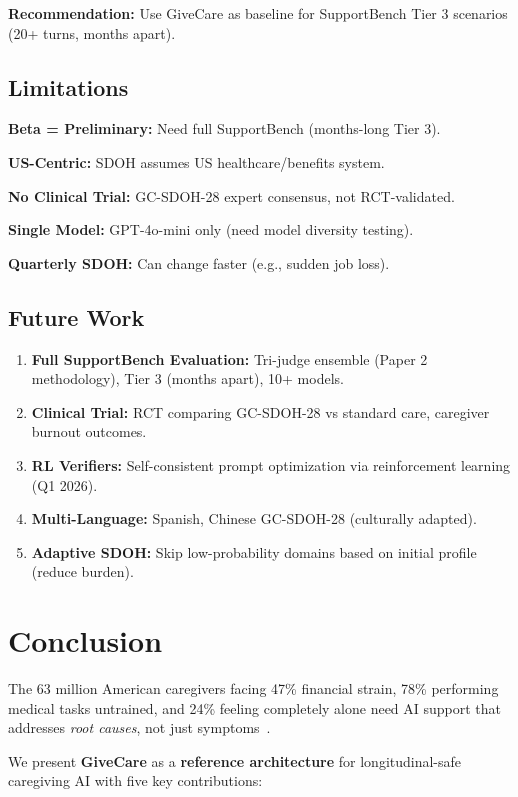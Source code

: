 \documentclass{article}
\begin{document}
\textbf{Recommendation:} Use GiveCare as baseline for SupportBench Tier 3 scenarios (20+ turns, months apart).

%
\subsection{Limitations}%
\label{subsec:Limitations}%
\textbf{Beta = Preliminary:} Need full SupportBench (months-long Tier 3).

\textbf{US-Centric:} SDOH assumes US healthcare/benefits system.

\textbf{No Clinical Trial:} GC-SDOH-28 expert consensus, not RCT-validated.

\textbf{Single Model:} GPT-4o-mini only (need model diversity testing).

\textbf{Quarterly SDOH:} Can change faster (e.g., sudden job loss).

%
\subsection{Future Work}%
\label{subsec:FutureWork}%
\begin{enumerate}
    \item \textbf{Full SupportBench Evaluation:} Tri-judge ensemble (Paper 2 methodology), Tier 3 (months apart), 10+ models.
    \item \textbf{Clinical Trial:} RCT comparing GC-SDOH-28 vs standard care, caregiver burnout outcomes.
    \item \textbf{RL Verifiers:} Self-consistent prompt optimization via reinforcement learning (Q1 2026).
    \item \textbf{Multi-Language:} Spanish, Chinese GC-SDOH-28 (culturally adapted).
    \item \textbf{Adaptive SDOH:} Skip low-probability domains based on initial profile (reduce burden).
\end{enumerate}

%
\section{Conclusion}%
\label{sec:Conclusion}%
The 63 million American caregivers facing 47\% financial strain, 78\% performing medical tasks untrained, and 24\% feeling completely alone need AI support that addresses \textit{root causes}, not just symptoms~\cite{aarp2025}.

We present \textbf{GiveCare} as a \textbf{reference architecture} for longitudinal-safe caregiving AI with five key contributions:
\end{document}
